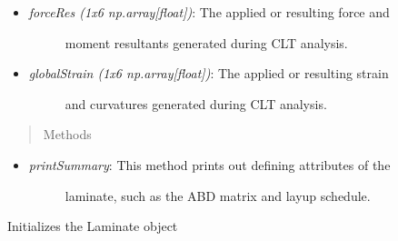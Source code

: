 \documentclass[letterpaper,10pt,english]{sphinxmanual}
\begin{document}
\begin{fulllineitems}
\begin{itemize}
\begin{description}
\end{description}

\item {} \begin{description}
\item[{\emph{forceRes (1x6 np.array{[}float{]})}: The applied or resulting force and}] \leavevmode
moment resultants generated during CLT analysis.

\end{description}

\item {} \begin{description}
\item[{\emph{globalStrain (1x6 np.array{[}float{]})}:  The applied or resulting strain}] \leavevmode
and curvatures generated during CLT analysis.

\end{description}

\end{itemize}
\begin{quote}\begin{description}
\item[{Methods}] \leavevmode
\end{description}\end{quote}
\begin{itemize}
\item {} \begin{description}
\item[{\emph{printSummary}: This method prints out defining attributes of the}] \leavevmode
laminate, such as the ABD matrix and layup schedule.

\end{description}

\end{itemize}

\begin{fulllineitems}
\label{structures:AeroComBAT.Structures.Laminate.__init__}
Initializes the Laminate object


\end{fulllineitems}
\end{fulllineitems}
\end{document}
